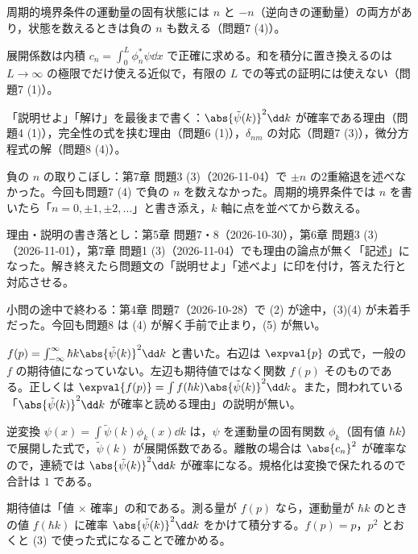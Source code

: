 \begin{daiji}
  \item 周期的境界条件の運動量の固有状態には $n$ と $-n$（逆向きの運動量）の両方があり，状態を数えるときは負の $n$ も数える（問題7 (4)）。
  \item 展開係数は内積 $c_{n}=\int_{0}^{L}\phi_{n}^{*}\psi\dd x$ で正確に求める。和を積分に置き換えるのは $L\to\infty$ の極限でだけ使える近似で，有限の $L$ での等式の証明には使えない（問題7 (1)）。
  \item 「説明せよ」「解け」を最後まで書く：$\abs{\tilde{\psi}(k)}^{2}\dd k$ が確率である理由（問題4 (1)），完全性の式を挟む理由（問題6 (1)），$\delta_{nm}$ の対応（問題7 (3)），微分方程式の解（問題8 (4)）。
\end{daiji}
\begin{maemo}
  \item 負の $n$ の取りこぼし：第7章 問題3 (3)（2026-11-04）で $\pm n$ の2重縮退を述べなかった。今回も問題7 (4) で負の $n$ を数えなかった。周期的境界条件では $n$ を書いたら「$n=0,\pm1,\pm2,\ldots$」と書き添え，$k$ 軸に点を並べてから数える。
  \item 理由・説明の書き落とし：第5章 問題7・8（2026-10-30），第6章 問題3 (3)（2026-11-01），第7章 問題1 (3)（2026-11-04）でも理由の論点が無く「記述」になった。解き終えたら問題文の「説明せよ」「述べよ」に印を付け，答えた行と対応させる。
  \item 小問の途中で終わる：第4章 問題7（2026-10-28）で (2) が途中，(3)(4) が未着手だった。今回も問題8 は (4) が解く手前で止まり，(5) が無い。
\end{maemo}
\begin{kotaeran}
   $f(p)=\int_{-\infty}^{\infty}\hbar k\abs{\tilde{\psi}(k)}^{2}\dd k$ と書いた。右辺は $\expval{p}$ の式で，一般の $f$ の期待値になっていない。左辺も期待値ではなく関数 $f(p)$ そのものである。正しくは $\expval{f(p)}=\int f(\hbar k)\abs{\tilde{\psi}(k)}^{2}\dd k$。また，問われている「$\abs{\tilde{\psi}(k)}^{2}\dd k$ が確率と読める理由」の説明が無い。
\end{kotaeran}
\begin{rikai}
  \item 逆変換 $\psi(x)=\int\tilde{\psi}(k)\phi_{k}(x)\dd k$ は，$\psi$ を運動量の固有関数 $\phi_{k}$（固有値 $\hbar k$）で展開した式で，$\tilde{\psi}(k)$ が展開係数である。離散の場合は $\abs{c_{n}}^{2}$ が確率なので，連続では $\abs{\tilde{\psi}(k)}^{2}\dd k$ が確率になる。規格化は変換で保たれるので合計は $1$ である。
  \item 期待値は「値 $\times$ 確率」の和である。測る量が $f(p)$ なら，運動量が $\hbar k$ のときの値 $f(\hbar k)$ に確率 $\abs{\tilde{\psi}(k)}^{2}\dd k$ をかけて積分する。$f(p)=p$，$p^{2}$ とおくと (3) で使った式になることで確かめる。
\end{rikai}
